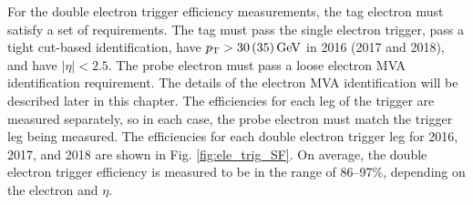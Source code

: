 For the double electron trigger efficiency measurements, the tag electron must satisfy a set of requirements. The tag must pass 
the single electron trigger, pass a tight cut-based identification, have $p_{\mathrm{T}}>30\,(35)\,\text{Ge\hspace{-.08em}V}$ in 2016 (2017 and 2018), and have $|\eta|<2.5$. 
The probe electron must pass a loose electron MVA identification requirement. The details of the electron MVA identification will be described later in this chapter.
The efficiencies for each leg 
of the trigger are measured separately, so in each case, the probe electron must match the trigger leg being measured. 
The efficiencies for each double electron trigger leg for 2016, 2017, and 2018 are shown in Fig. \ref{fig:ele_trig_SF}.
On average, the double electron trigger efficiency is measured to be in the range of 86--97\%, depending on the electron \pt and $\eta$.

